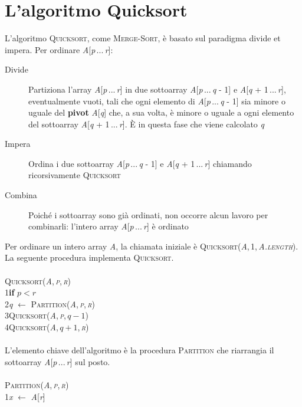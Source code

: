 \documentclass[10pt, a4paper]{report}
\newcommand\firsttab[1][0.5cm]{\hspace*{#1}}
\newcommand\secondtab[1][1cm]{\hspace*{#1}}
\begin{document}
\section{L'algoritmo Quicksort}
L'algoritmo \textsc{Quicksort}, come \textsc{Merge-Sort}, è basato sul paradigma divide et impera. Per ordinare \textit{A}[\textit{p}\,...\,\textit{r}]:
\begin{description}
\item[Divide]Partiziona l'array \textit{A}[\textit{p}\,...\,\textit{r}] in due sottoarray \textit{A}[\textit{p}\,...\,\textit{q} - 1] e \textit{A}[\textit{q} + 1\,...\,\textit{r}], eventualmente vuoti, tali che ogni elemento di \textit{A}[\textit{p}\,...\,\textit{q} - 1] sia minore o uguale del \textbf{pivot} \textit{A}[\textit{q}] che, a sua volta, è minore o uguale a ogni elemento del sottoarray \textit{A}[\textit{q} + 1\,...\,\textit{r}]. È in questa fase che viene calcolato \textit{q}
\item[Impera]Ordina i due sottoarray \textit{A}[\textit{p}\,...\,\textit{q} - 1] e \textit{A}[\textit{q} + 1\,...\,\textit{r}] chiamando ricorsivamente \textsc{Quicksort}
\item[Combina]Poiché i sottoarray sono già ordinati, non occorre alcun lavoro per combinarli: l'intero array \textit{A}[\textit{p}\,...\,\textit{r}] è ordinato
\end{description}
Per ordinare un intero array \textit{A}, la chiamata iniziale è \textsc{Quicksort(\textit{A},\,1,\,\textit{A.length})}.\\La seguente procedura implementa \textsc{Quicksort}.\\\\
\textsc{Quicksort(\textit{A},\,\textit{p},\,\textit{r})}\\
1\firsttab\textbf{if} $p < r$\\
2\secondtab\textit{q} $\leftarrow$ \textsc{Partition(\textit{A},\,\textit{p},\,\textit{r})}\\
3\secondtab\textsc{Quicksort(\textit{A},\,\textit{p},\,$q-1$)}\\
4\secondtab\textsc{Quicksort(\textit{A},\,$q+1$,\,\textit{r})}\\\\
L'elemento chiave dell'algoritmo è la procedura \textsc{Partition} che riarrangia il sottoarray \textit{A}[\textit{p}\,...\,\textit{r}] sul posto.\\\\
\textsc{Partition(\textit{A},\,\textit{p},\,\textit{r})}\\
1\firsttab\textit{x} $\leftarrow$ \textit{A}[\textit{r}]\\
\end{document}
